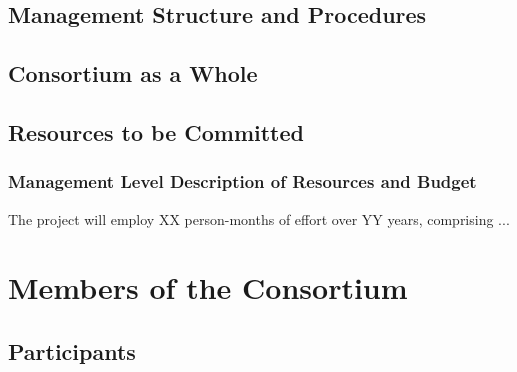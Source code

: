 \documentclass[noworkareas,deliverables,\classoptions]{euproposal}       %
\begin{document}
\begin{proposal}


\newpage
\subsection{Management Structure and Procedures}


\draftpage
\subsection{Consortium as a Whole}

\draftpage

\subsection{Resources to be Committed}


\subsubsection*{Management Level Description of Resources and Budget}


The project will employ XX person-months of effort over YY years,
comprising ...



\newpage


\section{Members of the Consortium}


\subsection{Participants}


\end{proposal}
\end{document}
